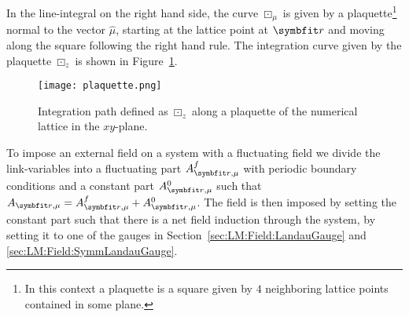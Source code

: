 In the line-integral on the right hand side, the curve $\boxdot_\mu$ is given by a plaquette\footnote{In this context a plaquette is a square given by $4$ neighboring lattice points contained in some plane.}
normal to the vector $\hat{\mu}$, starting at the lattice point at $\v{r}$ and moving along the square following the right hand rule. The integration curve given by the plaquette $\boxdot_z$
is shown in Figure~\ref{fig:LM:Field:Fluc:plaquetteSum}.
\begin{figure}[h]
    \centering
    \texttt{[image: plaquette.png]}
    \caption{Integration path defined as $\boxdot_z$ along a plaquette of the numerical lattice in the $xy$-plane.}
    \label{fig:LM:Field:Fluc:plaquetteSum}
\end{figure}

To impose an external field on a system with a fluctuating field we divide the link-variables into a fluctuating part $A^f_{\v{r},\mu}$ with periodic boundary conditions
and a constant part $A^0_{\v{r},\mu}$ such that $A_{\v{r},\mu} = A^f_{\v{r},\mu} + A^0_{\v{r},\mu}$. The field is then imposed by setting the constant part such that there is a
net field induction through the system, \eg by setting it to one of the gauges in Section~\ref{sec:LM:Field:LandauGauge} and \ref{sec:LM:Field:SymmLandauGauge}.



